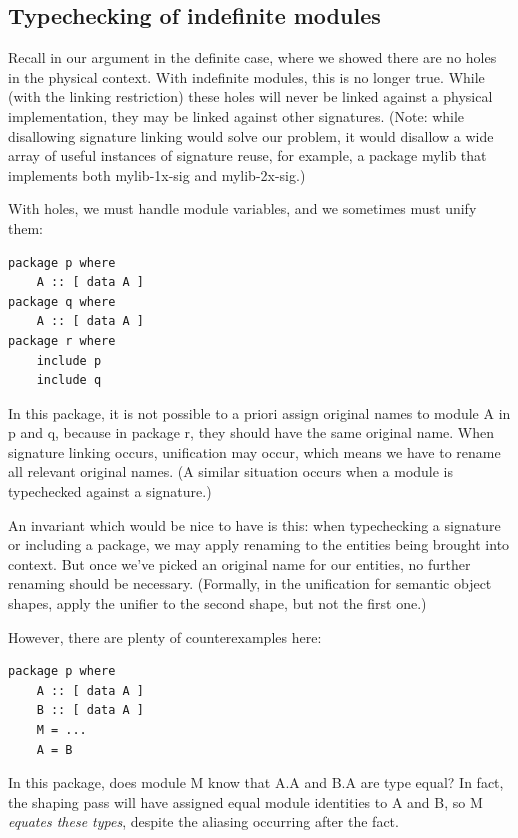 \documentclass{article}
\begin{document}
\subsection{Typechecking of indefinite modules}\label{sec:typechecking-indefinite}

Recall in our argument in the definite case, where we showed there are
no holes in the physical context.  With indefinite modules, this is no
longer true. While (with the linking restriction) these holes will never
be linked against a physical implementation, they may be linked against
other signatures.  (Note: while disallowing signature linking would
solve our problem, it would disallow a wide array of useful instances of
signature reuse, for example, a package mylib that implements both
mylib-1x-sig and mylib-2x-sig.)

With holes, we must handle module variables, and we sometimes must unify them:

\begin{verbatim}
package p where
    A :: [ data A ]
package q where
    A :: [ data A ]
package r where
    include p
    include q
\end{verbatim}

In this package, it is not possible to a priori assign original names to
module A in p and q, because in package r, they should have the same
original name.  When signature linking occurs, unification may occur,
which means we have to rename all relevant original names. (A similar
situation occurs when a module is typechecked against a signature.)

An invariant which would be nice to have is this: when typechecking a
signature or including a package, we may apply renaming to the entities
being brought into context.  But once we've picked an original name for
our entities, no further renaming should be necessary. (Formally, in the
unification for semantic object shapes, apply the unifier to the second
shape, but not the first one.)

However, there are plenty of counterexamples here:

\begin{verbatim}
package p where
    A :: [ data A ]
    B :: [ data A ]
    M = ...
    A = B
\end{verbatim}

In this package, does module M know that A.A and B.A are type equal?  In
fact, the shaping pass will have assigned equal module identities to A
and B, so M \emph{equates these types}, despite the aliasing occurring
after the fact.
\end{document}
